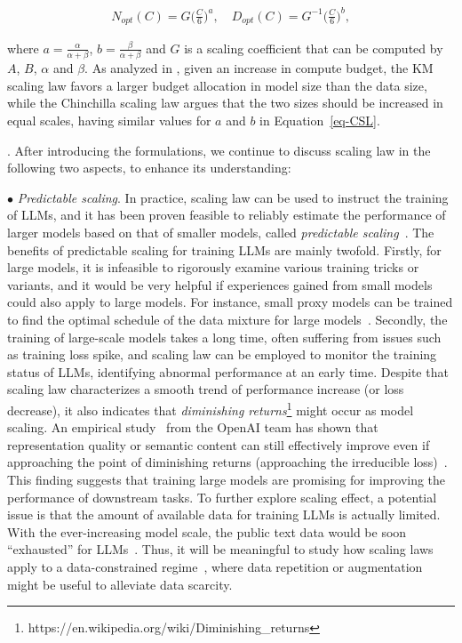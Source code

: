 \begin{eqnarray}\label{eq-CSL}
N_{opt}(C)=G \bigg(\frac{C}{6}\bigg)^a, \text{~~~}
D_{opt}(C)=G^{-1} \bigg(\frac{C}{6}\bigg)^b, 
\end{eqnarray}\nonumber


\noindent where $a=\frac{\alpha}{\alpha+\beta}$,  $b=\frac{\beta}{\alpha+\beta}$ and $G$ is a scaling coefficient that can be computed by $A$, $B$, $\alpha$ and $\beta$. As analyzed in \cite{Hoffmann-arxiv-2022-Training}, given an increase in compute budget, the KM scaling law favors a larger budget allocation in model size than the data size, while the Chinchilla scaling law argues that the two sizes should be increased in equal scales, \ie having similar values for $a$ and $b$ in Equation~\eqref{eq-CSL}. 

. After introducing the formulations, we continue to discuss scaling law in the following two aspects, to enhance its understanding: 

{
$\bullet$ \emph{Predictable scaling}. %
In practice, scaling law can be used to instruct the training of LLMs, and 
it has been proven   feasible to reliably estimate the performance of larger models based on that of smaller models,   called \emph{predictable scaling}~\cite{OpenAI-OpenAI-2023-GPT-4}. 
The benefits of predictable scaling for training LLMs are mainly twofold.  
Firstly, for large models, it is infeasible to rigorously examine various training tricks or variants, and it would be very  helpful if experiences gained from small models could also apply to large models. 
For instance, small proxy models can be trained to find the optimal schedule of the data mixture for large models~\cite{Xie-arxiv-2023-doremi}. 
Secondly, the training of large-scale models takes a long time,  often suffering from issues such as training loss spike, and scaling law can be employed to monitor the training status of LLMs, \eg identifying abnormal performance at an early time. Despite that scaling law characterizes a smooth trend of performance increase (or loss decrease), it also indicates that  \emph{diminishing returns}\footnote{https://en.wikipedia.org/wiki/Diminishing\_returns} might occur as model scaling. %
An empirical study~\cite{Henighan-2020-scalinglaw}  from the OpenAI team has shown that 
representation quality or semantic content can still effectively improve even if approaching the point of diminishing returns (\ie approaching the irreducible loss)~\cite{Henighan-2020-scalinglaw}. This finding suggests  that training large models are  promising for improving the  performance of downstream tasks. 
To further explore scaling effect, a potential issue is that the amount of available data for training LLMs is actually limited. With the ever-increasing model scale, the public text data would be soon ``exhausted'' for LLMs~\cite{Villalobos-arXiv-2023-runout}.  Thus, it will be meaningful to study how scaling laws apply to  a data-constrained regime~\cite{Muennighoff-arXiv-2023-dataconstrained}, where data  repetition or augmentation might be useful to alleviate data scarcity.   }    

